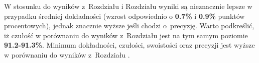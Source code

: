 W stosunku do wyników z~Rozdziału  i Rozdziału  wyniki są nieznacznie lepsze w przypadku średniej dokładności (wzrost odpowiednio o \textbf{0.7\%} i \textbf{0.9\%} punktów procentowych), jednak znacznie wyższe jeśli chodzi o~precyzję. Warto podkreślić, iż czułość w porównaniu do wyników z~Rozdziału  jest na tym samym poziomie \textbf{91.2-91.3\%}.
Minimum dokładności, czułości, swoistości oraz precyzji jest wyższe w porównaniu do wyników z~Rozdziału .
